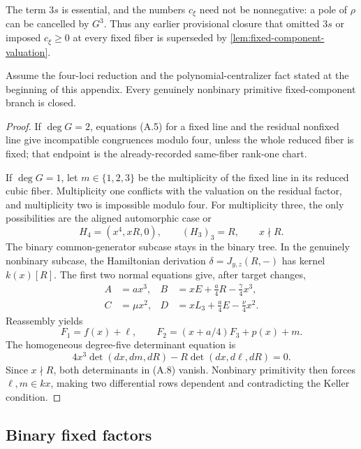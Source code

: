 The term \(3s\) is essential, and the numbers \(c_\xi\) need not be
nonnegative: a pole of \(\rho\) can be cancelled by \(G^3\).  Thus any
earlier provisional closure that omitted \(3s\) or imposed
\(c_\xi\ge0\) at every fixed fiber is superseded by
\cref{lem:fixed-component-valuation}.

\begin{theorem}
\label{thm:quartic-nonbinary-fixed-components}
Assume the four-loci reduction and the polynomial-centralizer fact stated
at the beginning of this appendix.  Every genuinely nonbinary primitive
fixed-component branch is closed.
\end{theorem}

\begin{proof}
If \(\deg G=2\), equations (A.5) for a fixed line and the residual
nonfixed line give incompatible congruences modulo four, unless the whole
reduced fiber is fixed; that endpoint is the already-recorded same-fiber
rank-one chart.

If \(\deg G=1\), let \(m\in\{1,2,3\}\) be the multiplicity of the fixed
line in its reduced cubic fiber.  Multiplicity one conflicts with the
valuation on the residual factor, and multiplicity two is impossible
modulo four.  For multiplicity three, the only possibilities are the
aligned automorphic case or
\[
 H_4=(x^4,xR,0),\qquad (H_3)_3=R,\qquad x\nmid R.   \tag{A.6}
\]
The binary common-generator subcase stays in the binary tree.  In the
genuinely nonbinary subcase, the Hamiltonian derivation
\(\delta=J_{y,z}(R,-)\) has kernel \(k(x)[R]\).  The first two normal
equations give, after target changes,
\[
\begin{aligned}
 A&=ax^3,&
 B&=xE+\frac a4R-\frac\gamma4x^3,\\
 C&=\mu x^2,&
 D&=xL_3+\frac a4E-\frac\nu4x^2.
\end{aligned}                                      \tag{A.7}
\]
Reassembly yields
\[
 F_1=f(x)+\ell,\qquad
 F_2=(x+a/4)F_3+p(x)+m.
\]
The homogeneous degree-five determinant equation is
\[
 4x^3\det(dx,dm,dR)-R\det(dx,d\ell,dR)=0.          \tag{A.8}
\]
Since \(x\nmid R\), both determinants in (A.8) vanish.  Nonbinary
primitivity then forces \(\ell,m\in kx\), making two differential rows
dependent and contradicting the Keller condition.
\end{proof}

\subsection{Binary fixed factors}

